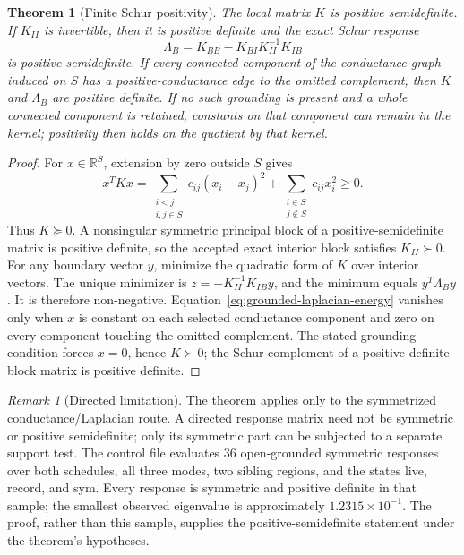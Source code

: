 \documentclass[11pt]{article}
\newtheorem{theorem}[definition]{Theorem}
\theoremstyle{remark}
\newtheorem{remark}[definition]{Remark}
\numberwithin{equation}{section}
\begin{document}
\begin{theorem}[Finite Schur positivity]\label{thm:finite-schur-positivity}
The local matrix \(K\) is positive semidefinite. If \(K_{II}\) is invertible, then it is positive definite and the exact Schur response
\begin{equation}
  \Lambda_B=K_{BB}-K_{BI}K_{II}^{-1}K_{IB}
  \label{eq:schur-positivity-response}
\end{equation}
is positive semidefinite. If every connected component of the conductance graph induced on \(S\) has a positive-conductance edge to the omitted complement, then \(K\) and \(\Lambda_B\) are positive definite. If no such grounding is present and a whole connected component is retained, constants on that component can remain in the kernel; positivity then holds on the quotient by that kernel.
\end{theorem}

\begin{proof}
For \(x\in\mathbb R^S\), extension by zero outside \(S\) gives
\begin{equation}
 x^TKx
 =\sum_{\substack{i<j\\ i,j\in S}}c_{ij}(x_i-x_j)^2
  +\sum_{\substack{i\in S\\j\notin S}}c_{ij}x_i^2\ge0.
 \label{eq:grounded-laplacian-energy}
\end{equation}
Thus \(K\succeq0\). A nonsingular symmetric principal block of a positive-semidefinite matrix is positive definite, so the accepted exact interior block satisfies \(K_{II}\succ0\). For any boundary vector \(y\), minimize the quadratic form of \(K\) over interior vectors. The unique minimizer is \(z=-K_{II}^{-1}K_{IB}y\), and the minimum equals \(y^T\Lambda_By\). It is therefore non-negative. Equation~\eqref{eq:grounded-laplacian-energy} vanishes only when \(x\) is constant on each selected conductance component and zero on every component touching the omitted complement. The stated grounding condition forces \(x=0\), hence \(K\succ0\); the Schur complement of a positive-definite block matrix is positive definite.
\end{proof}

\begin{remark}[Directed limitation]
The theorem applies only to the symmetrized conductance/Laplacian route. A directed response matrix need not be symmetric or positive semidefinite; only its symmetric part can be subjected to a separate support test. The control file evaluates 36 open-grounded symmetric responses over both schedules, all three modes, two sibling regions, and the states live, record, and sym. Every response is symmetric and positive definite in that sample; the smallest observed eigenvalue is approximately \(1.2315\times10^{-1}\). The proof, rather than this sample, supplies the positive-semidefinite statement under the theorem's hypotheses.
\end{remark}
\end{document}
